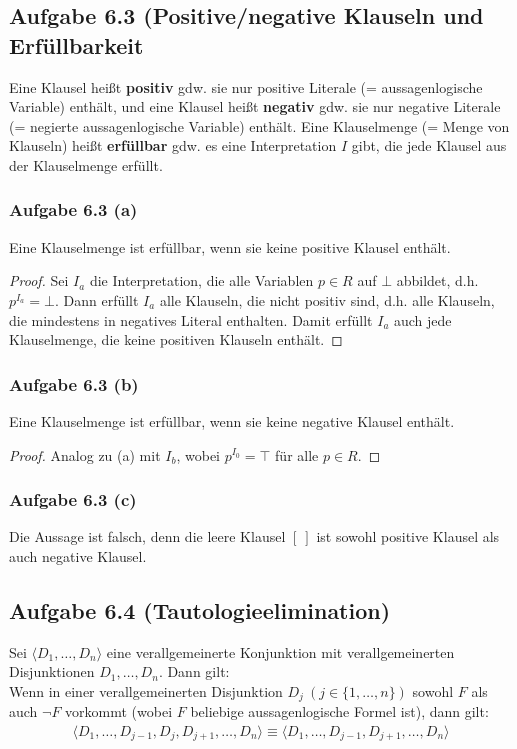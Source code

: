 \subsection{Aufgabe 6.3 (Positive/negative Klauseln und Erfüllbarkeit}
Eine Klausel heißt \textbf{positiv} gdw. sie nur positive Literale (= aussagenlogische Variable) enthält, und eine Klausel heißt \textbf{negativ} gdw. sie nur negative Literale (= negierte aussagenlogische Variable) enthält.\nl
Eine Klauselmenge (= Menge von Klauseln) heißt \textbf{erfüllbar} gdw. es eine Interpretation $I$ gibt, die jede Klausel aus der Klauselmenge erfüllt.

\subsubsection{Aufgabe 6.3 (a)}
Eine Klauselmenge ist erfüllbar, wenn sie keine positive Klausel enthält.

\begin{proof}
	Sei $I_a$ die Interpretation, die alle Variablen $p\in R$ auf $\bot$ abbildet, d.h. $p^{I_a}=\bot$. Dann erfüllt $I_a$ alle Klauseln, die nicht positiv sind, d.h. alle Klauseln, die mindestens in negatives Literal enthalten. 
	Damit erfüllt $I_a$ auch jede Klauselmenge, die keine positiven Klauseln enthält.
\end{proof}

\subsubsection{Aufgabe 6.3 (b)}
Eine Klauselmenge ist erfüllbar, wenn sie keine negative Klausel enthält.

\begin{proof}
	Analog zu (a) mit $I_b$, wobei $p^{I_0}=\top$ für alle $p\in R$.
\end{proof}

\subsubsection{Aufgabe 6.3 (c)}
Die Aussage ist falsch, denn die leere Klausel $[~]$ ist sowohl positive Klausel als auch negative Klausel.

\subsection{Aufgabe 6.4 (Tautologieelimination)}
Sei $\langle D_1,\ldots,D_n\rangle$ eine verallgemeinerte Konjunktion mit verallgemeinerten Disjunktionen $D_1,\ldots,D_n$. 
Dann gilt:\\
Wenn in einer verallgemeinerten Disjunktion $D_j~(j\in\lbrace1,\ldots,n\rbrace)$ sowohl $F$ als auch $\neg F$ vorkommt (wobei $F$ beliebige aussagenlogische Formel ist), dann gilt:
\begin{align*}
	\big\langle D_1,\ldots,D_{j-1},D_j,D_{j+1},\ldots, D_n\big\rangle\equiv\big\langle D_1,\ldots,D_{j-1},D_{j+1},\ldots,D_n\big\rangle
\end{align*}

